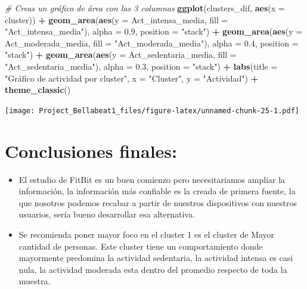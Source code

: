 \documentclass[
]{article}
\newenvironment{Shaded}{\begin{snugshade}}{\end{snugshade}}
\newcommand{\AttributeTok}[1]{\textcolor[rgb]{0.13,0.29,0.53}{#1}}
\newcommand{\CommentTok}[1]{\textcolor[rgb]{0.56,0.35,0.01}{\textit{#1}}}
\newcommand{\FloatTok}[1]{\textcolor[rgb]{0.00,0.00,0.81}{#1}}
\newcommand{\FunctionTok}[1]{\textcolor[rgb]{0.13,0.29,0.53}{\textbf{#1}}}
\newcommand{\NormalTok}[1]{#1}
\newcommand{\SpecialCharTok}[1]{\textcolor[rgb]{0.81,0.36,0.00}{\textbf{#1}}}
\newcommand{\StringTok}[1]{\textcolor[rgb]{0.31,0.60,0.02}{#1}}
\begin{document}
\begin{Shaded}
\begin{Highlighting}[]
\CommentTok{\# Creas un gráfico de área con las 3 columnas}
\FunctionTok{ggplot}\NormalTok{(clusters\_dif, }\FunctionTok{aes}\NormalTok{(}\AttributeTok{x =}\NormalTok{ cluster)) }\SpecialCharTok{+} 
  \FunctionTok{geom\_area}\NormalTok{(}\FunctionTok{aes}\NormalTok{(}\AttributeTok{y =}\NormalTok{ Act\_intensa\_media, }\AttributeTok{fill =} \StringTok{"Act\_intensa\_media"}\NormalTok{), }\AttributeTok{alpha =} \FloatTok{0.9}\NormalTok{, }\AttributeTok{position =} \StringTok{"stack"}\NormalTok{) }\SpecialCharTok{+}  
  \FunctionTok{geom\_area}\NormalTok{(}\FunctionTok{aes}\NormalTok{(}\AttributeTok{y =}\NormalTok{ Act\_moderada\_media, }\AttributeTok{fill =} \StringTok{"Act\_moderada\_media"}\NormalTok{), }\AttributeTok{alpha =} \FloatTok{0.4}\NormalTok{, }\AttributeTok{position =} \StringTok{"stack"}\NormalTok{) }\SpecialCharTok{+} 
  \FunctionTok{geom\_area}\NormalTok{(}\FunctionTok{aes}\NormalTok{(}\AttributeTok{y =}\NormalTok{ Act\_sedentaria\_media, }\AttributeTok{fill =} \StringTok{"Act\_sedentaria\_media"}\NormalTok{), }\AttributeTok{alpha =} \FloatTok{0.3}\NormalTok{, }\AttributeTok{position =} \StringTok{"stack"}\NormalTok{) }\SpecialCharTok{+} 
  \FunctionTok{labs}\NormalTok{(}\AttributeTok{title =} \StringTok{"Gráfico de actividad por cluster"}\NormalTok{, }\AttributeTok{x =} \StringTok{"Cluster"}\NormalTok{, }\AttributeTok{y =} \StringTok{"Actividad"}\NormalTok{) }\SpecialCharTok{+} 
  \FunctionTok{theme\_classic}\NormalTok{()}
\end{Highlighting}
\end{Shaded}

\texttt{[image: Project\_Bellabeat1\_files/figure-latex/unnamed-chunk-25-1.pdf]}

\section{Conclusiones finales:}\label{conclusiones-finales}

\begin{itemize}
\item
  El estudio de FitBit es un buen comienzo pero necesitariamos ampliar
  la información, la información más confiable es la creada de primera
  fuente, la que nosotros podemos recabar a partir de nuestros
  dispositivos con nuestros usuarios, sería bueno desarrollar esa
  alternativa.
\item
  Se recomienda poner mayor foco en el cluster 1 es el cluster de Mayor
  cantidad de personas. Este cluster tiene un comportamiento donde
  mayormente predomina la actividad sedentaria, la actividad intensa es
  casi nula, la actividad moderada esta dentro del promedio respecto de
  toda la muestra.
\end{itemize}
\end{document}
